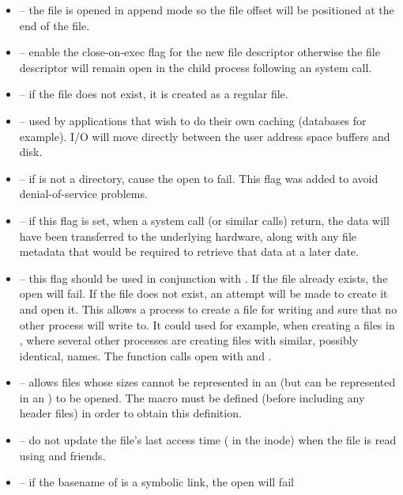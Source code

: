 \begin{itemize}
	\item {} -- the file is opened in append mode so the file offset will be positioned at the end of the file.
	\item {} -- enable  the close-on-exec flag for the new file descriptor otherwise the file descriptor will
		remain open in the child process following an  system call.
	\item {} -- if the file does not exist, it is created as a regular file.
	\item {} -- used by applications that wish to do their own caching (databases for example). I/O will move
		directly between the user address space buffers and disk.
	\item {} -- if  is not a directory, cause the open to fail. This
              flag was added to  avoid denial-of-service  problems.
	\item {} -- if this flag is set, when a  system call (or similar calls) return, the data will have
              been transferred to the underlying hardware, along with any file metadata  that would be required to retrieve that data
              at a later date.
	\item {} -- this flag should be used in conjunction with . If the file already exists, the open 
		will fail. If the file does not exist, an attempt will be made to create it and open it. This allows a process to create 
		a file for writing and sure that no other process will write to. It could used for example, when creating a files in ,
		where several other processes are creating files with similar, possibly identical, names. The  function 
		calls open with  and .
	\item {} -- allows files whose sizes cannot be represented in an 
              (but can be represented  in  an  )  to  be  opened.   The   macro must 
              be defined (before including any header files) in order to obtain this definition.
	\item {} -- do  not update the file's last access time ( in the inode) when the file is read
		using  and friends.
	\item {} -- if the basename of  is a symbolic link, the open will fail 

\end{itemize}
